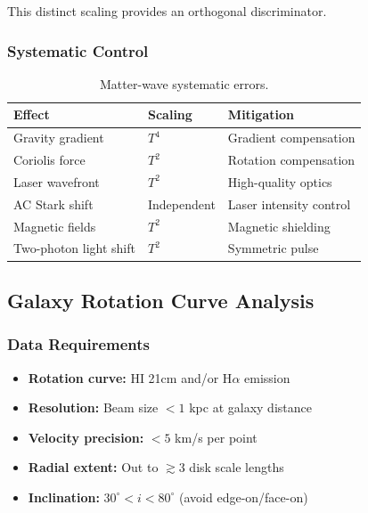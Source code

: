 This distinct scaling provides an orthogonal discriminator.

\subsubsection{Systematic Control}

\begin{table}[h!]
\centering
\caption{Matter-wave systematic errors.}
\label{tab:mw_systematics}
\begin{tabular}{lll}
\toprule
\textbf{Effect} & \textbf{Scaling} & \textbf{Mitigation} \\
\midrule
Gravity gradient & $T^4$ & Gradient compensation \\
Coriolis force & $T^2$ & Rotation compensation \\
Laser wavefront & $T^2$ & High-quality optics \\
AC Stark shift & Independent & Laser intensity control \\
Magnetic fields & $T^2$ & Magnetic shielding \\
Two-photon light shift & $T^2$ & Symmetric pulse \\
\bottomrule
\end{tabular}
\end{table}

\subsection{Galaxy Rotation Curve Analysis}\label{app:rotation_protocol}

\subsubsection{Data Requirements}

\begin{itemize}
\item \textbf{Rotation curve:} HI 21cm and/or H$\alpha$ emission
\item \textbf{Resolution:} Beam size $< 1$ kpc at galaxy distance
\item \textbf{Velocity precision:} $< 5$ km/s per point
\item \textbf{Radial extent:} Out to $\gtrsim 3$ disk scale lengths
\item \textbf{Inclination:} $30^\circ < i < 80^\circ$ (avoid edge-on/face-on)
\end{itemize}

